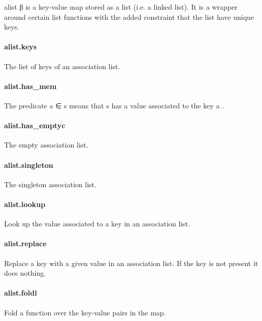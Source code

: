 \documentclass{article}
\begin{document}
\par
\colorbox[RGB]{253,246,227}{{{{\color[RGB]{101, 123, 131} alist β }}}} is a key-value map stored as a 
\colorbox[RGB]{253,246,227}{{{{\color[RGB]{101, 123, 131} list }}}} (i.e. a linked list).
It is a wrapper around certain 
\colorbox[RGB]{253,246,227}{{{{\color[RGB]{101, 123, 131} list }}}} functions with the added constraint
that the list have unique keys.
\paragraph{alist.keys}
\par
The list of keys of an association list.
\paragraph{alist.has\_mem}
\par
The predicate 
\colorbox[RGB]{253,246,227}{{{{\color[RGB]{101, 123, 131} a ∈ s }}}} means that 
\colorbox[RGB]{253,246,227}{{{{\color[RGB]{101, 123, 131} s }}}} has a value associated to the key 
\colorbox[RGB]{253,246,227}{{{{\color[RGB]{101, 123, 131} a }}}}.
\paragraph{alist.has\_emptyc}
\par
The empty association list.
\paragraph{alist.singleton}
\par
The singleton association list.
\paragraph{alist.lookup}
\par
Look up the value associated to a key in an association list.
\paragraph{alist.replace}
\par
Replace a key with a given value in an association list.
If the key is not present it does nothing.
\paragraph{alist.foldl}
\par
Fold a function over the key-value pairs in the map.
\end{document}
